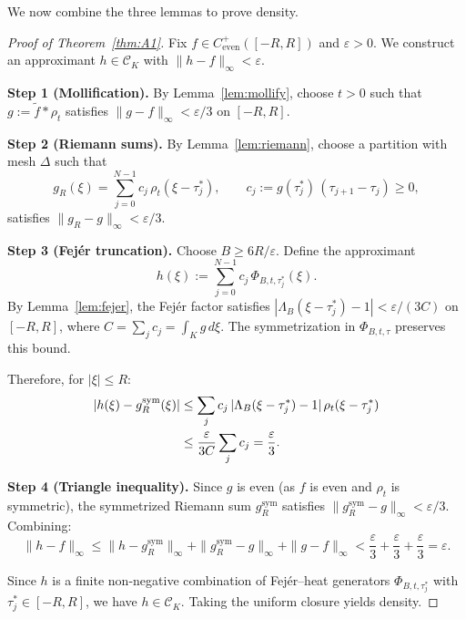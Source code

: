 \documentclass[11pt,a4paper]{article}
\theoremstyle{definition}
\theoremstyle{remark}
\begin{document}
We now combine the three lemmas to prove density.

\begin{proof}[Proof of Theorem~\ref{thm:A1}]
Fix $f \in C^+_{\mathrm{even}}([-R,R])$ and $\varepsilon > 0$. We construct an approximant $h \in \mathcal{C}_K$ with $\|h - f\|_\infty < \varepsilon$.

\textbf{Step 1 (Mollification).} By Lemma~\ref{lem:mollify}, choose $t > 0$ such that $g := \tilde{f} * \rho_t$ satisfies $\|g - f\|_\infty < \varepsilon/3$ on $[-R, R]$.

\textbf{Step 2 (Riemann sums).} By Lemma~\ref{lem:riemann}, choose a partition with mesh $\Delta$ such that
\[
  g_R(\xi) = \sum_{j=0}^{N-1} c_j\, \rho_t(\xi - \tau_j^*), \qquad c_j := g(\tau_j^*)\, (\tau_{j+1} - \tau_j) \geq 0,
\]
satisfies $\|g_R - g\|_\infty < \varepsilon/3$.

\textbf{Step 3 (Fej\'er truncation).} Choose $B \geq 6R/\varepsilon$. Define the approximant
\begin{equation}\label{eq:approx-h}
  h(\xi) := \sum_{j=0}^{N-1} c_j\, \Phi_{B, t, \tau_j^*}(\xi).
\end{equation}
By Lemma~\ref{lem:fejer}, the Fej\'er factor satisfies $|\Lambda_B(\xi - \tau_j^*) - 1| < \varepsilon/(3C)$ on $[-R, R]$, where $C = \sum_j c_j = \int_K g\, d\xi$. The symmetrization in $\Phi_{B,t,\tau}$ preserves this bound.

Therefore, for $|\xi| \leq R$:
\begin{align}
  |h(\xi) - g_R^{\mathrm{sym}}(\xi)|
  &\leq \sum_j c_j\, |\Lambda_B(\xi - \tau_j^*) - 1|\, \rho_t(\xi - \tau_j^*) \notag \\
  &\leq \frac{\varepsilon}{3C} \sum_j c_j = \frac{\varepsilon}{3}. \label{eq:step3-err}
\end{align}

\textbf{Step 4 (Triangle inequality).} Since $g$ is even (as $f$ is even and $\rho_t$ is symmetric), the symmetrized Riemann sum $g_R^{\mathrm{sym}}$ satisfies $\|g_R^{\mathrm{sym}} - g\|_\infty < \varepsilon/3$. Combining:
\[
  \|h - f\|_\infty \leq \|h - g_R^{\mathrm{sym}}\|_\infty + \|g_R^{\mathrm{sym}} - g\|_\infty + \|g - f\|_\infty
  < \frac{\varepsilon}{3} + \frac{\varepsilon}{3} + \frac{\varepsilon}{3} = \varepsilon.
\]

Since $h$ is a finite non-negative combination of Fej\'er--heat generators $\Phi_{B,t,\tau_j^*}$ with $\tau_j^* \in [-R, R]$, we have $h \in \mathcal{C}_K$. Taking the uniform closure yields density.
\end{proof}
\end{document}

